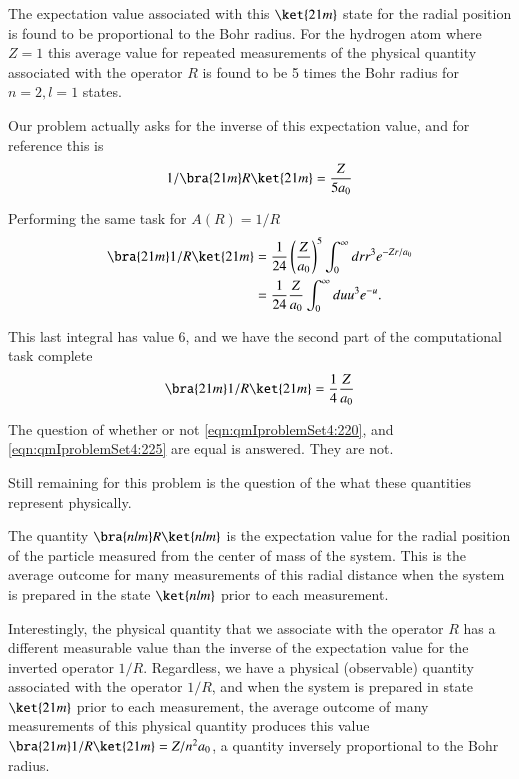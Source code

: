 The expectation value associated with this $\ket{21m}$ state for the radial position is found to be proportional to the Bohr radius.  For the hydrogen atom where $Z=1$ this average value for repeated measurements of the physical quantity associated with the operator $R$ is found to be 5 times the Bohr radius for $n=2, l=1$ states.

Our problem actually asks for the inverse of this expectation value, and for reference this is
\begin{equation}\label{eqn:qmIproblemSet4:220}
1/ \bra{21m} R \ket{21m}
=
\frac{ Z }{ 5 a_0 } %
\end{equation}

Performing the same task for $A(R) = 1/R$
\begin{align*}
\bra{21m} 1/R \ket{21m}
&=
\inv{24} \left(\frac{ Z }{a_0 } \right)^5
\int_0^\infty
dr 
r^3
e^{-Z r/ a_0} 
\\
&=
\inv{24} \frac{ Z }{ a_0 } 
\int_0^\infty
du 
u^3
e^{-u}.
\end{align*}

This last integral has value $6$, and we have the second part of the computational task complete
\begin{equation}\label{eqn:qmIproblemSet4:225}
\bra{21m} 1/R \ket{21m} = \inv{4} \frac{ Z }{ a_0 } 
\end{equation}

The question of whether or not \ref{eqn:qmIproblemSet4:220}, and \ref{eqn:qmIproblemSet4:225} are equal is answered.  They are not.

Still remaining for this problem is the question of the what these quantities represent physically.

The quantity $\bra{nlm} R \ket{nlm}$ is the expectation value for the radial position of the particle measured from the center of mass of the system.  This is the average outcome for many measurements of this radial distance when the system is prepared in the state $\ket{nlm}$ prior to each measurement.

Interestingly, the physical quantity that we associate with the operator $R$ has a different measurable value than the inverse of the expectation value for the inverted operator $1/R$.  Regardless, we have a physical (observable) quantity associated with the operator $1/R$, and when the system is prepared in state $\ket{21m}$ prior to each measurement, the average outcome of many measurements of this physical quantity produces this value $\bra{21m} 1/R \ket{21m} = Z/n^2 a_0$, a quantity inversely proportional to the Bohr radius.

